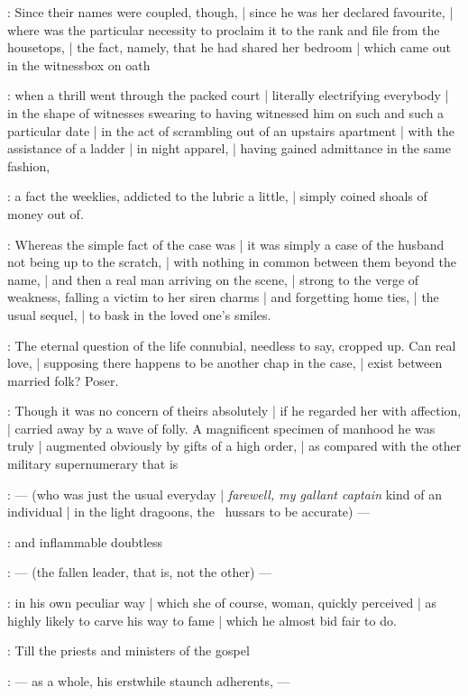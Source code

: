 :
Since their names were coupled, though, |
since he was her declared favourite, |
where was the particular necessity to proclaim it
to the rank and file from the housetops, |
the fact, namely, that he had shared her bedroom |
which came out in the witnessbox on oath

:
when a thrill went through the packed court |
literally electrifying everybody |
in the shape of witnesses swearing
to having witnessed him on such and such a particular date |
in the act of scrambling out of an upstairs apartment |
with the assistance of a ladder |
in night apparel, |
having gained admittance in the same fashion,

:
a fact the weeklies, addicted to the lubric a little, |
simply coined shoals of money out of.

:
Whereas the simple fact of the case was |
it was simply a case of the husband not being up to the scratch, |
with nothing in common between them beyond the name, |
and then a real man arriving on the scene, |
strong to the verge of weakness, falling a victim to her siren charms |
and forgetting home ties, |
the usual sequel, |
to bask in the loved one's smiles.

:
The eternal question of the life connubial, needless to say, cropped up.
Can real love, |
supposing there happens to be another chap in the case, |
exist between married folk?
Poser.

:
Though it was no concern of theirs absolutely |
if he regarded her with affection, |
carried away by a wave of folly.
A magnificent specimen of manhood he was truly |
augmented obviously by gifts of a high order, |
as compared with the other military supernumerary that is 

:
    --- (who was just the usual everyday |
        \emph{farewell, my gallant captain} kind of an individual |
        in the light dragoons, the ~hussars to be accurate) ---

:
and inflammable doubtless

:
    --- (the fallen leader, that is, not the other) ---

:
in his own peculiar way |
which she of course, woman, quickly perceived |
as highly likely to carve his way to fame |
which he almost bid fair to do.

:
Till the priests and ministers of the gospel

:
    --- as a whole, his erstwhile staunch adherents, ---

